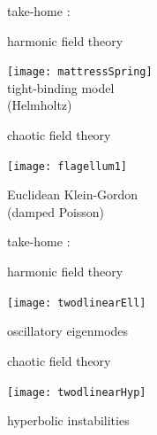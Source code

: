 \begin{frame}{take-home :   }
\begin{center}
            \begin{minipage}[c]{0.40\textwidth}\begin{center}
{\color{purple}harmonic} field theory
\bigskip

\texttt{[image: mattressSpring]}\\
{\color{blue}tight-binding} model \\ ({\color{blue}Helmholtz})
            \end{center}\end{minipage}
            \hspace{2ex}
            \begin{minipage}[c]{0.46\textwidth}\begin{center}
{\color{purple}chaotic} field theory\\
\bigskip
\bigskip
\bigskip

\texttt{[image: flagellum1]}\\
\bigskip

Euclidean {\color{blue}Klein-Gordon} \\ (damped {\color{blue}Poisson})
            \end{center}\end{minipage}
\end{center}
\end{frame}%

\begin{frame}{take-home :   }
\begin{center}
            \begin{minipage}[c]{0.40\textwidth}\begin{center}
{\color{purple}harmonic} field theory
\bigskip

\texttt{[image: twodlinearEll]}\\
\bigskip

{\color{blue}oscillatory eigenmodes}
            \end{center}\end{minipage}
            \hspace{2ex}
            \begin{minipage}[c]{0.46\textwidth}\begin{center}
{\color{purple}chaotic} field theory\\
\bigskip

\texttt{[image: twodlinearHyp]}\\
\bigskip

{\color{blue}hyperbolic instabilities}
            \end{center}\end{minipage}
\end{center}
\end{frame} %


